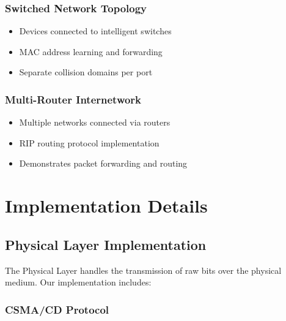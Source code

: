\documentclass[12pt,a4paper]{article}
\begin{document}
\subsubsection{Switched Network Topology}
\begin{itemize}
\item Devices connected to intelligent switches
\item MAC address learning and forwarding
\item Separate collision domains per port
\end{itemize}

\subsubsection{Multi-Router Internetwork}
\begin{itemize}
\item Multiple networks connected via routers
\item RIP routing protocol implementation
\item Demonstrates packet forwarding and routing
\end{itemize}

\newpage

\section{Implementation Details}

\subsection{Physical Layer Implementation}

The Physical Layer handles the transmission of raw bits over the physical medium. Our implementation includes:

\subsubsection{CSMA/CD Protocol}
\end{document}
